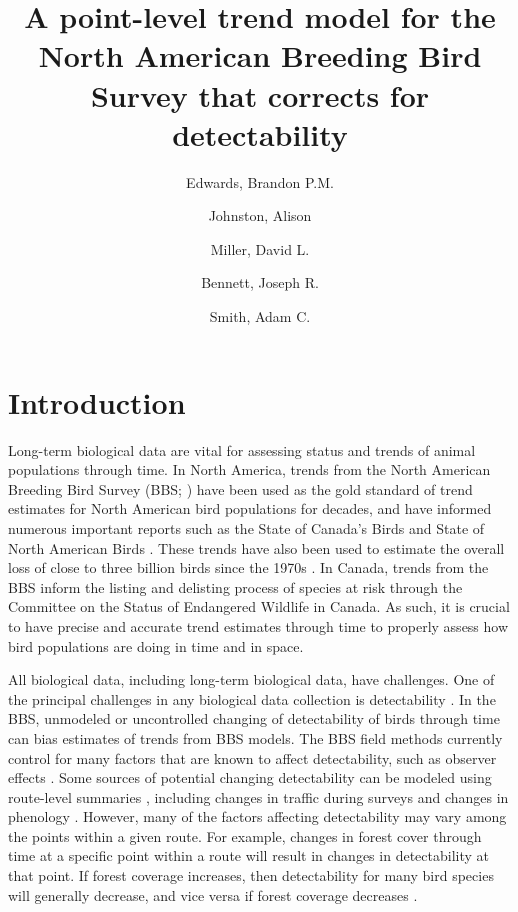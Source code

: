 \documentclass[12pt]{article}
\title{A point-level trend model for the North American Breeding Bird Survey that corrects for detectability}
\author{
	Edwards, Brandon P.M.\\
	\and
	Johnston, Alison\\
	\and
	Miller, David L.\\
	\and
	Bennett, Joseph R.\\
	\and
	Smith, Adam C.\\
}
\begin{document}
	
	\maketitle
	
	
	
\section{Introduction}

\par Long-term biological data are vital for assessing status and trends of animal populations through time.
In North America, trends from the North American Breeding Bird Survey (BBS; \citet{sauer_first_2017, hudson_role_2017}) have been used as the gold standard of trend estimates for North American bird populations for decades, and have informed numerous important reports such as the State of Canada's Birds \citep{north_american_bird_conservation_initiative_canada_state_2019} and State of North American Birds \citep{north_american_bird_conservation_initiative_canada_state_2022}.
These trends have also been used to estimate the overall loss of close to three billion birds since the 1970s \citep{rosenberg_decline_2019}.
In Canada, trends from the BBS inform the listing and delisting process of species at risk through the Committee on the Status of Endangered Wildlife in Canada.
As such, it is crucial to have precise and accurate trend estimates through time to properly assess how bird populations are doing in time and in space.

\par All biological data, including long-term biological data, have challenges.
One of the principal challenges in any biological data collection is detectability \citep{bennett_how_2024}.
In the BBS, unmodeled or uncontrolled changing of detectability of birds through time can bias estimates of trends from BBS models.
The BBS field methods currently control for many factors that are known to affect detectability, such as observer effects \citet{sauer_observer_1994}.
Some sources of potential changing detectability can be modeled using route-level summaries \citep{smith_patterns_2023}, including changes in traffic during surveys \citep{griffith_traffic_2010} and changes in phenology \citep{english_current_2021}.
However, many of the factors affecting detectability may vary among the points within a given route.
For example, changes in forest cover through time at a specific point within a route will result in changes in detectability at that point.
If forest coverage increases, then detectability for many bird species will generally decrease, and vice versa if forest coverage decreases \citep{edwards_point_2023, yip_sound_2017}.
\end{document}
